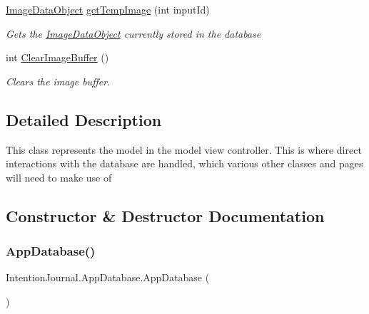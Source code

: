 \begin{DoxyCompactItemize}
\hyperlink{class_intention_journal_1_1_image_data_object}{Image\+Data\+Object} \hyperlink{class_intention_journal_1_1_app_database_a1f6754a18f434ae8bb7d2b5ec8eb7c19}{get\+Temp\+Image} (int input\+Id)
\begin{DoxyCompactList}\small\item\em Gets the \hyperlink{class_intention_journal_1_1_image_data_object}{Image\+Data\+Object} currently stored in the database \end{DoxyCompactList}\item 
int \hyperlink{class_intention_journal_1_1_app_database_a4e859f5d31d6c889307543f919afa9bd}{Clear\+Image\+Buffer} ()
\begin{DoxyCompactList}\small\item\em Clears the image buffer. \end{DoxyCompactList}\end{DoxyCompactItemize}


\subsection{Detailed Description}
This class represents the model in the model view controller. This is where direct interactions with the database are handled, which various other classes and pages will need to make use of 



\subsection{Constructor \& Destructor Documentation}
\mbox{\label{class_intention_journal_1_1_app_database_ac4a9875c8d5253d2218c45ef6dd7094e}} 
\subsubsection{\texorpdfstring{App\+Database()}{AppDatabase()}}
{\footnotesize\ttfamily Intention\+Journal.\+App\+Database.\+App\+Database (\begin{DoxyParamCaption}{ }\end{DoxyParamCaption})\hspace{0.3cm}{\ttfamily [inline]}}



